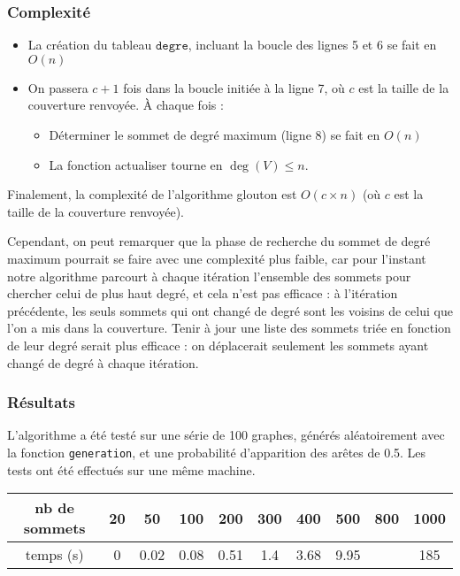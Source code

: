 \documentclass[a4paper,10pt]{article}
\newcommand*{\itemb}{\item[$\bullet$]}
\newcommand*{\itemt}{\item[$\blacktriangleright$]}
\begin{document}
\subsubsection{Complexité}

\begin{itemize}
 \itemb La création du tableau $\mathtt{degre}$, incluant la boucle des lignes 5 et 6 se fait en $O(n)$
 \itemb On passera $c+1$ fois dans la boucle initiée à la ligne 7, où $c$ est la taille de la couverture renvoyée. À chaque fois :
\begin{itemize}
\itemt Déterminer le sommet de degré maximum (ligne 8) se fait en $O(n)$
\itemt La fonction actualiser tourne en $\deg(V)\leqslant n$.
\end{itemize}
\end{itemize}

Finalement, la complexité de l'algorithme glouton est $O(c\times n)$ (où $c$ est la taille de la couverture renvoyée).

Cependant, on peut remarquer que la phase de recherche du sommet de degré maximum pourrait se faire avec une complexité plus faible, car pour l'instant notre algorithme parcourt à chaque itération l'ensemble des sommets pour chercher celui de plus haut degré, et cela n'est pas efficace : à l'itération précédente, les seuls sommets qui ont changé de degré sont les voisins de celui que l'on a mis dans la couverture. Tenir à jour une liste des sommets triée en fonction de leur degré serait plus efficace : on déplacerait seulement les sommets ayant changé de degré à chaque itération.

\subsubsection{Résultats}

L'algorithme a été testé sur une série de 100 graphes, générés aléatoirement avec la fonction \texttt{generation}, et une probabilité d'apparition des arêtes de 0.5. 
Les tests ont été effectués sur une même machine.

\bigskip
\begin{tabular}{|c|c|c|c|c|c|c|c|c|c|}
	\hline 
	nb de sommets & 20 & 50 & 100 & 200 & 300 & 400 & 500 & 800 & 1000 \\
	\hline
	temps (s) & 0 & 0.02 & 0.08 & 0.51 & 1.4 & 3.68 & 9.95 &  & 185 \\
	\hline
\end{tabular}

\bigskip
\end{document}
